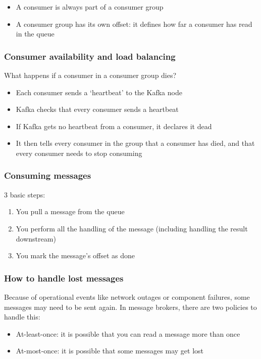 \documentclass{article}
\begin{document}
\begin{itemize}
    \item A consumer is always part of a consumer group
    \item A consumer group has its own offset: it defines how far a consumer has read in the queue
\end{itemize}

\subsubsection{Consumer availability and load balancing}

What happens if a consumer in a consumer group dies?

\begin{itemize}
    \item Each consumer sends a `heartbeat' to the Kafka node
    \item Kafka checks that every consumer sends a heartbeat
    \item If Kafka gets no heartbeat from a consumer, it declares it dead
    \item It then tells every consumer in the group that a consumer has died, and that every consumer needs to stop consuming
\end{itemize}

\subsubsection{Consuming messages}

3 basic steps:

\begin{enumerate}
    \item You pull a message from the queue
    \item You perform all the handling of the message (including handling the result downstream)
    \item You mark the message's offset as done 
\end{enumerate}

\subsubsection{How to handle lost messages}

Because of operational events like network outages or component failures, some messages
may need to be sent again. In message brokers, there are two policies to handle this:

\begin{itemize}
    \item At-least-once: it is possible that you can read a message more than once
    \item At-most-once: it is possible that some messages may get lost
\end{itemize}
\end{document}
